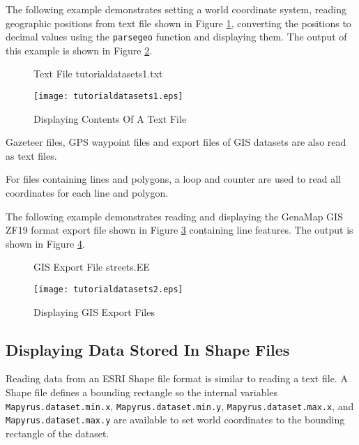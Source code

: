 The following example demonstrates
setting a world coordinate system,
reading geographic positions from text file shown in Figure
\ref{tutorialdatasets1txt}, converting the positions to decimal
values using the \texttt{parsegeo} function and displaying them.
The output of this example is shown in
Figure \ref{tutorialdatasets1}.

\begin{figure}[htb]

\caption{Text File tutorialdatasets1.txt}
\label{tutorialdatasets1txt}
\end{figure}



\begin{figure}[htb]
\texttt{[image: tutorialdatasets1.eps]}
\caption{Displaying Contents Of A Text File}
\label{tutorialdatasets1}
\end{figure}

Gazeteer files, GPS waypoint files and export files of GIS datasets
are also read as text files.

For files containing lines and polygons, a loop and counter
are used to read all coordinates for each line and polygon.

The following example demonstrates
reading and displaying the GenaMap GIS ZF19 format export file shown in Figure
\ref{streetsEE} containing line
features.
The output is shown in Figure \ref{tutorialdatasets2}.

\begin{figure}[htb]

\caption{GIS Export File streets.EE}
\label{streetsEE}
\end{figure}



\begin{figure}[htb]
\texttt{[image: tutorialdatasets2.eps]}
\caption{Displaying GIS Export Files}
\label{tutorialdatasets2}
\end{figure}

\subsection{Displaying Data Stored In Shape Files}

Reading data from an ESRI Shape file format is similar to reading a text file.
A Shape file defines a bounding rectangle so the internal variables
\texttt{Mapyrus.dataset.min.x}, \texttt{Mapyrus.dataset.min.y},
\texttt{Mapyrus.dataset.max.x}, and \texttt{Mapyrus.dataset.max.y} are
available to set world coordinates to the bounding rectangle of the dataset.

